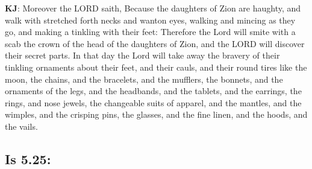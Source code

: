 \textbf{KJ}: Moreover the LORD saith, Because the daughters of Zion are haughty, and walk with stretched forth necks and wanton eyes, walking and mincing as they go, and making a tinkling with their feet: Therefore the Lord will smite with a scab the crown of the head of the daughters of Zion, and the LORD will discover their secret parts. In that day the Lord will take away the bravery of their tinkling ornaments about their feet, and their cauls, and their round tires like the moon, the chains, and the bracelets, and the mufflers, the bonnets, and the ornaments of the legs, and the headbands, and the tablets, and the earrings, the rings, and nose jewels, the changeable suits of apparel, and the mantles, and the wimples, and the crisping pins, the glasses, and the fine linen, and the hoods, and the vails.

\subsection*{Is 5.25:} 
